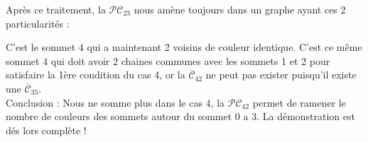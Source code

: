 \begin{description}
Après ce traitement, la ${\mathcal{PC}}_{23}$ nous amène toujours dans un graphe ayant ces 2 particularités :\

C’est le sommet 4 qui a maintenant 2 voisins de couleur identique. C’est ce même sommet 4
qui doit avoir 2 chaines communes avec les sommets 1 et 2 pour satisfaire la 1ère condition du cas 4, or la $\overline{\mathcal{C}}_{42}$ ne peut pas exister puisqu’il existe une $\overline{\mathcal{C}}_{35}$.\\

Conclusion : Nous ne somme plus dans le cas 4, la ${\mathcal{PC}}_{42}$ permet de ramener le nombre de couleurs des sommets autour du sommet 0 a 3. 
La démonstration est dés lors complète !
\end{description}












